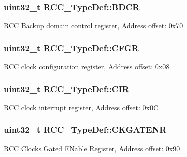 \subsubsection[{\texorpdfstring{B\+D\+CR}{BDCR}}]{ uint32\+\_\+t R\+C\+C\+\_\+\+Type\+Def\+::\+B\+D\+CR}\hypertarget{struct_r_c_c___type_def_a05be375db50e8c9dd24fb3bcf42d7cf1}{}\label{struct_r_c_c___type_def_a05be375db50e8c9dd24fb3bcf42d7cf1}
R\+CC Backup domain control register, Address offset\+: 0x70 
\subsubsection[{\texorpdfstring{C\+F\+GR}{CFGR}}]{ uint32\+\_\+t R\+C\+C\+\_\+\+Type\+Def\+::\+C\+F\+GR}\hypertarget{struct_r_c_c___type_def_a0721b1b729c313211126709559fad371}{}\label{struct_r_c_c___type_def_a0721b1b729c313211126709559fad371}
R\+CC clock configuration register, Address offset\+: 0x08 
\subsubsection[{\texorpdfstring{C\+IR}{CIR}}]{ uint32\+\_\+t R\+C\+C\+\_\+\+Type\+Def\+::\+C\+IR}\hypertarget{struct_r_c_c___type_def_aeadf3a69dd5795db4638f71938704ff0}{}\label{struct_r_c_c___type_def_aeadf3a69dd5795db4638f71938704ff0}
R\+CC clock interrupt register, Address offset\+: 0x0C 
\subsubsection[{\texorpdfstring{C\+K\+G\+A\+T\+E\+NR}{CKGATENR}}]{ uint32\+\_\+t R\+C\+C\+\_\+\+Type\+Def\+::\+C\+K\+G\+A\+T\+E\+NR}\hypertarget{struct_r_c_c___type_def_a744988eef66294323f32fdca172ad7ad}{}\label{struct_r_c_c___type_def_a744988eef66294323f32fdca172ad7ad}
R\+CC Clocks Gated E\+Nable Register, Address offset\+: 0x90 
